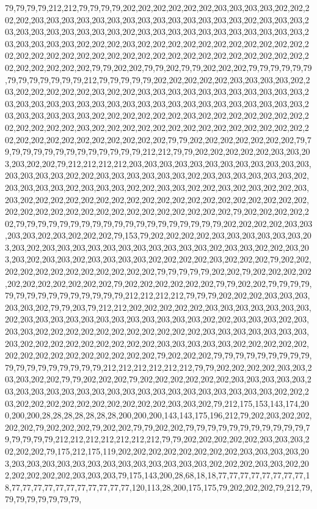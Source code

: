 79,79,79,79,212,212,79,79,79,79,202,202,202,202,202,202,203,203,203,203,202,202,202,202,203,203,203,203,203,203,203,203,203,203,203,203,203,203,202,203,203,203,203,203,203,203,203,203,203,203,202,203,203,203,203,203,203,203,203,203,203,203,203,203,203,203,203,202,202,202,203,202,202,202,202,202,202,202,202,202,202,202,202,202,202,202,202,202,202,202,202,202,202,202,202,202,202,202,202,202,202,202,202,202,202,202,202,202,79,79,202,202,79,79,202,79,79,202,202,202,79,79,79,79,79,79,79,79,79,79,79,79,79,212,79,79,79,79,79,202,202,202,202,202,203,203,203,203,202,203,202,202,202,202,202,203,202,202,203,203,203,203,203,203,203,203,203,203,203,203,203,203,203,203,203,203,203,203,203,203,203,203,203,203,203,203,203,203,203,203,203,203,203,203,203,202,202,202,202,202,202,203,202,202,202,202,202,202,202,202,202,202,202,202,203,202,202,202,202,202,202,202,202,202,202,202,202,202,202,202,202,202,202,202,202,202,202,202,202,202,79,79,202,202,202,202,202,202,202,79,79,79,79,79,79,79,79,79,79,79,79,79,79,212,212,79,79,202,202,202,202,202,203,203,203,203,202,202,79,212,212,212,212,203,203,203,203,203,203,203,203,203,203,203,203,203,203,203,203,202,202,203,203,203,203,203,203,202,203,203,203,203,203,203,202,203,203,203,203,202,203,203,203,202,202,203,203,202,202,203,202,203,202,202,203,203,202,202,202,202,202,202,202,202,202,202,202,202,202,202,202,202,202,202,202,202,202,202,202,202,202,202,202,202,202,202,202,202,202,202,79,202,202,202,202,202,79,79,79,79,79,79,79,79,79,79,79,79,79,79,79,79,79,79,79,202,202,202,202,203,203,203,203,202,203,202,202,202,79,153,79,202,202,202,202,203,203,203,203,203,203,203,203,202,203,203,203,203,203,203,203,203,203,203,203,202,203,203,202,202,203,203,203,202,203,203,202,203,203,203,203,202,202,202,202,203,202,202,202,79,202,202,202,202,202,202,202,202,202,202,202,202,79,79,79,79,79,202,202,79,202,202,202,202,202,202,202,202,202,202,202,79,202,202,202,202,202,202,79,79,202,202,79,79,79,79,79,79,79,79,79,79,79,79,79,79,79,212,212,212,212,79,79,79,202,202,202,203,203,203,203,203,202,79,79,203,79,212,212,202,202,202,202,202,203,203,203,203,203,203,203,202,203,203,203,203,203,203,203,203,203,203,203,203,202,202,203,203,203,202,203,203,203,202,202,202,202,202,202,202,202,202,202,202,203,203,203,203,203,203,203,203,202,202,202,202,202,202,202,202,202,203,203,203,203,203,202,202,202,202,202,202,202,202,202,202,202,202,202,202,202,79,202,202,202,79,79,79,79,79,79,79,79,79,79,79,79,79,79,79,79,79,79,212,212,212,212,212,212,79,79,202,202,202,202,203,203,203,203,202,202,79,79,202,202,202,79,202,202,202,202,202,202,203,203,203,203,203,203,203,203,203,203,203,203,203,203,203,203,203,203,203,203,203,203,203,202,202,203,202,202,202,202,202,202,202,202,202,202,203,203,202,79,212,175,153,143,174,200,200,200,28,28,28,28,28,28,28,200,200,200,143,143,175,196,212,79,202,203,202,202,202,202,79,202,202,202,79,202,202,79,79,202,202,79,79,79,79,79,79,79,79,79,79,79,79,79,79,79,79,212,212,212,212,212,212,212,79,79,202,202,202,202,202,203,203,203,202,202,202,79,175,212,175,119,202,202,202,202,202,202,202,202,203,203,203,203,203,203,203,203,203,203,203,203,203,203,203,203,203,203,202,202,202,203,203,202,202,202,202,202,202,203,203,203,79,175,143,200,28,68,18,18,77,77,77,77,77,77,77,77,18,77,77,77,77,77,77,77,77,77,77,77,120,113,28,200,175,175,79,202,202,202,79,212,79,79,79,79,79,79,79,79,